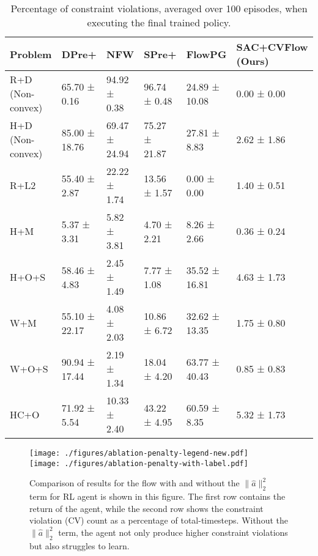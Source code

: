 \begin{table}[tb]
\begin{center}
\begin{tabular}{|l|l|l|l|l|l|}
\hline
Problem          & DPre+         & NFW           & SPre+         & FlowPG        & SAC+CVFlow (Ours) \\ \hline
R+D (Non-convex) & 65.70 ± 0.16  & 94.92 ± 0.38  & 96.74 ± 0.48  & 24.89 ± 10.08 & 0.00 ± 0.00       \\ \hline
H+D (Non-convex) & 85.00 ± 18.76 & 69.47 ± 24.94 & 75.27 ± 21.87 & 27.81 ± 8.83  & 2.62 ± 1.86       \\ \hline
R+L2             & 55.40 ± 2.87  & 22.22 ± 1.74  & 13.56 ± 1.57  & 0.00 ± 0.00   & 1.40 ± 0.51       \\ \hline
H+M              & 5.37 ± 3.31   & 5.82 ± 3.81   & 4.70 ± 2.21   & 8.26 ± 2.66   & 0.36 ± 0.24       \\ \hline
H+O+S            & 58.46 ± 4.83  & 2.45 ± 1.49   & 7.77 ± 1.08   & 35.52 ± 16.81 & 4.63 ± 1.73       \\ \hline
W+M              & 55.10 ± 22.17 & 4.08 ± 2.03   & 10.86 ± 6.72  & 32.62 ± 13.35 & 1.75 ± 0.80       \\ \hline
W+O+S            & 90.94 ± 17.44 & 2.19 ± 1.34   & 18.04 ± 4.20  & 63.77 ± 40.43 & 0.85 ± 0.83       \\ \hline
HC+O             & 71.92 ± 5.54  & 10.33 ± 2.40  & 43.22 ± 4.95  & 60.59 ± 8.35  & 5.32 ± 1.73       \\ \hline   
\end{tabular}
        \caption{Percentage of constraint violations, averaged over 100 episodes, when executing the final trained policy.}
        \label{tab:cv-at-runtime}
\end{center}
\end{table}

\begin{figure*}[tb]
    \centering	
    \texttt{[image: ./figures/ablation-penalty-legend-new.pdf]}\\
    \vspace{-0.2cm}
    \texttt{[image: ./figures/ablation-penalty-with-label.pdf]}
    \vspace{-0.2cm}
    \caption{Comparison of results for the flow with and without the $\|\hat{a}\|_2^2$ term for RL agent is shown in this figure. The first row contains the return of the agent, while the second row shows the constraint violation (CV) count as a percentage of total-timesteps. Without the $\|\hat{a}\|_2^2$  term, the agent not only produce higher constraint violations but also struggles to learn.}\label{fig:ablation_penalty}
    \vspace{-0.4cm}
\end{figure*}


